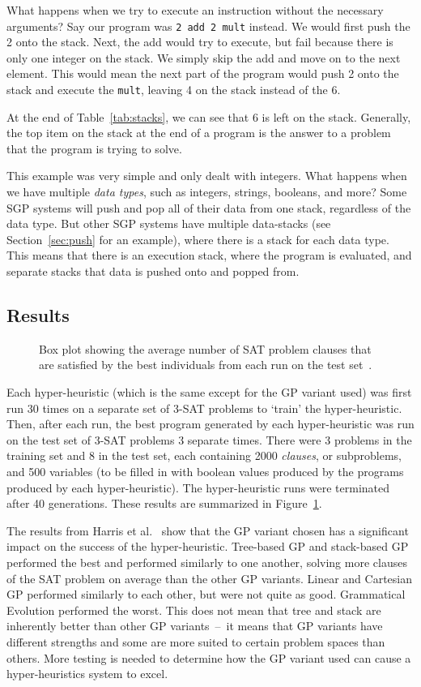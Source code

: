 \documentclass{sig-alternate}
\begin{document}
What happens when we try to execute an instruction without the necessary arguments? Say our program was \texttt{2~add~2~mult} instead. We would first push the 2 onto the stack. Next, the add would try to execute, but fail because there is only one integer on the stack. We simply skip the add and move on to the next element. This would mean the next part of the program would push 2 onto the stack and execute the \texttt{mult}, leaving 4 on the stack instead of the 6.

At the end of Table~\ref{tab:stacks}, we can see that 6 is left on the stack. Generally, the top item on the stack at the end of a program is the answer to a problem that the program is trying to solve.

This example was very simple and only dealt with integers. What happens when we have multiple \textit{data types}, such as integers, strings, booleans, and more? Some SGP systems will push and pop all of their data from one stack, regardless of the data type. But other SGP systems have multiple data-stacks (see Section~\ref{sec:push} for an example), where there is a stack for each data type. This means that there is an execution stack, where the program is evaluated, and separate stacks that data is pushed onto and popped from.

\subsection{Results}
\label{sec:gpresults}
\begin{figure}
	\centering
	\caption{Box plot showing the average number of SAT problem clauses that are satisfied by the best individuals from each run on the test set~\cite{harris:2015}.}
	\label{fig:gpvariants}
\end{figure}
Each hyper-heuristic (which is the same except for the GP variant used) was first run 30 times on a separate set of 3-SAT problems to `train' the hyper-heuristic. Then, after each run, the best program generated by each hyper-heuristic was run on the test set of 3-SAT problems 3 separate times. There were 3 problems in the training set and 8 in the test set, each containing 2000 \textit{clauses}, or subproblems, and 500 variables (to be filled in with boolean values produced by the programs produced by each hyper-heuristic). The hyper-heuristic runs were terminated after 40 generations. These results are summarized in Figure~\ref{fig:gpvariants}.

The results from Harris et al.~\cite{harris:2015} show that the GP variant chosen has a significant impact on the success of the hyper-heuristic. Tree-based GP and stack-based GP performed the best and performed similarly to one another, solving more clauses of the SAT problem on average than the other GP variants. Linear and Cartesian GP performed similarly to each other, but were not quite as good. Grammatical Evolution performed the worst. This does not mean that tree and stack are inherently better than other GP variants~--~it means that GP variants have different strengths and some are more suited to certain problem spaces than others. More testing is needed to determine how the GP variant used can cause a hyper-heuristics system to excel.
\end{document}
